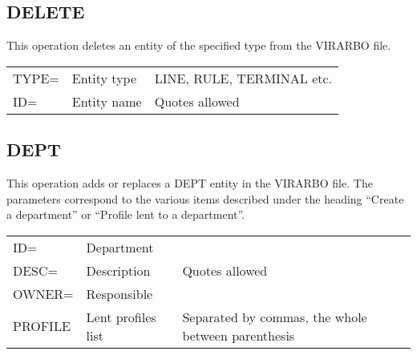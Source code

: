 \documentclass[letterpaper,10pt,english]{sphinxmanual}
\begin{document}

\subsection{DELETE}
\label{\detokenize{Installation_Guide:index-27}}\label{\detokenize{Installation_Guide:delete}}
This operation deletes an entity of the specified type from the VIRARBO file.


\begin{savenotes}\sphinxattablestart
\centering
\begin{tabulary}{\linewidth}[t]{|T|T|T|}
\hline
{}\relax &\relax &\relax \\
\hline
TYPE=
&
Entity type
&
LINE, RULE, TERMINAL etc.
\\
\hline
ID=
&
Entity name
&
Quotes allowed
\\
\hline
\end{tabulary}
\par
\sphinxattableend\end{savenotes}


\subsection{DEPT}
\label{\detokenize{Installation_Guide:dept}}\label{\detokenize{Installation_Guide:index-28}}
This operation adds or replaces a DEPT entity in the VIRARBO file. The parameters correspond to the various items
described under the heading “Create a department” or “Profile lent to a department”.


\begin{savenotes}\sphinxattablestart
\centering
\begin{tabulary}{\linewidth}[t]{|T|T|T|}
\hline
{}\relax &\relax &\relax \\
\hline
ID=
&
Department
&\\
\hline
DESC=
&
Description
&
Quotes allowed
\\
\hline
OWNER=
&
Responsible
&\\
\hline
PROFILE
&
Lent profiles list
&
Separated by commas, the whole between parenthesis
\\
\hline
\end{tabulary}
\par
\sphinxattableend\end{savenotes}
\end{document}
